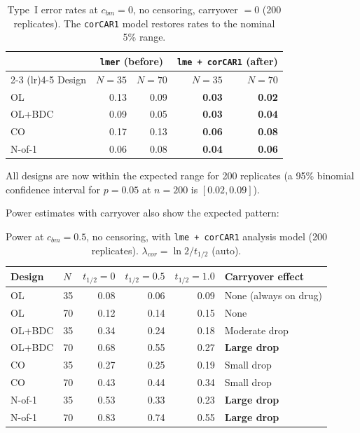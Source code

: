 \documentclass[11pt]{article}
\begin{document}
\begin{table}[h]
\centering
\caption{Type~I error rates at $c_{bm} = 0$, no censoring,
  carryover $= 0$ (200 replicates). The \texttt{corCAR1}
  model restores rates to the nominal 5\% range.}
\begin{tabular}{lrrrr}
\toprule
& \multicolumn{2}{c}{\texttt{lmer} (before)}
& \multicolumn{2}{c}{\texttt{lme + corCAR1} (after)} \\
\cmidrule(lr){2-3} \cmidrule(lr){4-5}
Design & $N = 35$ & $N = 70$ & $N = 35$ & $N = 70$ \\
\midrule
OL & 0.13 & 0.09 & \textbf{0.03} & \textbf{0.02} \\
OL+BDC & 0.09 & 0.05 & \textbf{0.03} & \textbf{0.04} \\
CO & 0.17 & 0.13 & \textbf{0.06} & \textbf{0.08} \\
N-of-1 & 0.06 & 0.08 & \textbf{0.04} & \textbf{0.06} \\
\bottomrule
\end{tabular}
\end{table}

All designs are now within the expected range for 200
replicates (a 95\% binomial confidence interval for
$p = 0.05$ at $n = 200$ is $[0.02, 0.09]$).

Power estimates with carryover also show the expected
pattern:

\begin{table}[h]
\centering
\caption{Power at $c_{bm} = 0.5$, no censoring, with
  \texttt{lme + corCAR1} analysis model (200 replicates).
  $\lambda_{cor} = \ln 2 / t_{1/2}$ (auto).}
\begin{tabular}{llrrrl}
\toprule
Design & $N$ & $t_{1/2} = 0$ & $t_{1/2} = 0.5$ &
  $t_{1/2} = 1.0$ & Carryover effect \\
\midrule
OL & 35 & 0.08 & 0.06 & 0.09 & None (always on drug) \\
OL & 70 & 0.12 & 0.14 & 0.15 & None \\
\midrule
OL+BDC & 35 & 0.34 & 0.24 & 0.18 & Moderate drop \\
OL+BDC & 70 & 0.68 & 0.55 & 0.27 & \textbf{Large drop} \\
\midrule
CO & 35 & 0.27 & 0.25 & 0.19 & Small drop \\
CO & 70 & 0.43 & 0.44 & 0.34 & Small drop \\
\midrule
N-of-1 & 35 & 0.53 & 0.33 & 0.23 & \textbf{Large drop} \\
N-of-1 & 70 & 0.83 & 0.74 & 0.55 & \textbf{Large drop} \\
\bottomrule
\end{tabular}
\end{table}
\end{document}
